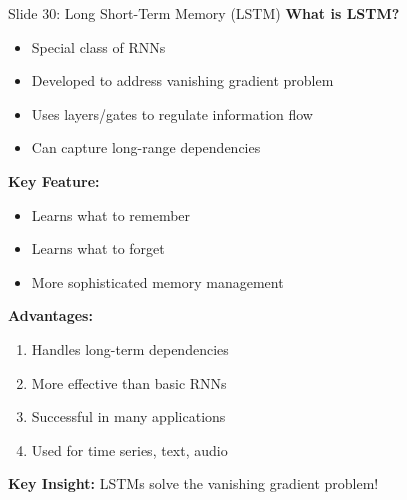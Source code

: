 \documentclass[8pt]{beamer}
\begin{document}
	\begin{frame}{Slide 30: Long Short-Term Memory (LSTM)}
		\fontsize{6.5}{7.5}\selectfont
		\textbf{What is LSTM?}
		\begin{itemize}
			\item Special class of RNNs
			\item Developed to address vanishing gradient problem
			\item Uses layers/gates to regulate information flow
			\item Can capture long-range dependencies
		\end{itemize}
		
		\vspace{0.1cm}
		\textbf{Key Feature:}
		\begin{itemize}
			\item Learns what to remember
			\item Learns what to forget
			\item More sophisticated memory management
		\end{itemize}
		
		\vspace{0.1cm}
		\textbf{Advantages:}
		\begin{enumerate}
			\item Handles long-term dependencies
			\item More effective than basic RNNs
			\item Successful in many applications
			\item Used for time series, text, audio
		\end{enumerate}
		
		\textcolor{myblue}{\textbf{Key Insight:}} LSTMs solve the vanishing gradient problem!
	\end{frame}
	
\end{document}
